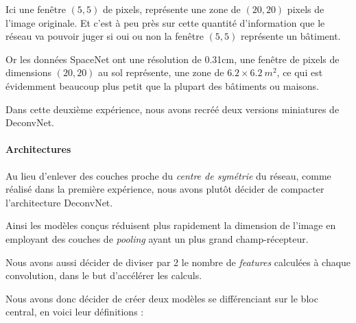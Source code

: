 \documentclass[a4paper, 11pt]{report}
\begin{document}
Ici une fenêtre $(5, 5)$ de pixels, représente une zone de $(20, 20)$ pixels de l'image originale. Et c'est à peu près sur cette quantité d'information que le réseau va pouvoir juger si oui ou non la fenêtre $(5, 5)$ représente un bâtiment.

Or les données SpaceNet ont une résolution de 0.31cm, une fenêtre de pixels de dimensions $(20, 20)$ au sol représente, une zone de $6.2 \times 6.2\ m^2$, ce qui est évidemment beaucoup plus petit que la plupart des bâtiments ou maisons.

Dans cette deuxième expérience, nous avons recréé deux versions miniatures de DeconvNet.
\paragraph{Architectures}
Au lieu d'enlever des couches proche du \emph{centre de symétrie} du réseau, comme réalisé dans la première expérience, nous avons plutôt décider de compacter l'architecture DeconvNet.

Ainsi les modèles conçus réduisent plus rapidement la dimension de l'image en employant des couches de \emph{pooling} ayant un plus grand champ-récepteur.

Nous avons aussi décider de diviser par 2 le nombre de \emph{features} calculées à chaque convolution, dans le but d’accélérer les calculs.

Nous avons donc décider de créer deux modèles se différenciant sur le bloc central, en voici leur définitions :
\end{document}
